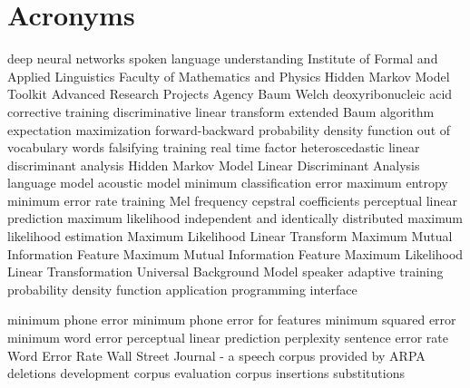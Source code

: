 \chapter{Acronyms}
\label{cha:acronyms}

\begin{acronym}[TDMA]
     {deep neural networks}
     {spoken language understanding}
     {Institute of Formal and Applied Linguistics}
     {Faculty of Mathematics and Physics}
     {Hidden Markov Model Toolkit}
     {Advanced Research Projects Agency}
     {Baum Welch}
     {deoxyribonucleic acid}
     {corrective training}
     {discriminative linear transform}
     {extended Baum algorithm}
     {expectation maximization}
     {forward-backward}
     {probability density function}
     {out of vocabulary words}
     {falsifying training}
     {real time factor}
     {heteroscedastic linear discriminant analysis}
     {Hidden Markov Model}
     {Linear Discriminant Analysis}
     {language model}
     {acoustic model}
     {minimum classification error}
     {maximum entropy}
     {minimum error rate training}
     {Mel frequency cepstral coefficients}
     {perceptual linear prediction}
     {maximum likelihood}
     {independent and identically distributed}
     {maximum likelihood estimation}
     {Maximum Likelihood Linear Transform}
     {Maximum Mutual Information}
     {Feature Maximum Mutual Information}
     {Feature Maximum Likelihood Linear Transformation}
     {Universal Background Model}
     {speaker adaptive training}
     {probability density function}
     {application programming interface}

     {minimum phone error}
     {minimum phone error for features}
     {minimum squared error}
     {minimum word error}
     {perceptual linear prediction}
     {perplexity}
     {sentence error rate}
     {Word Error Rate}
     {Wall Street Journal - a speech corpus provided by ARPA}
     {deletions}
     {development corpus}
     {evaluation corpus}
     {insertions}
     {substitutions}
\end{acronym}

